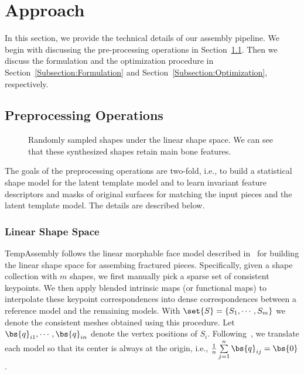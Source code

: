 \section{Approach}
\label{Section:Approach}

In this section, we provide the technical details of our assembly pipeline. We begin with discussing the pre-processing operations in Section~\ref{Subsection:Preprocessing:Operations}. Then we discuss the formulation and the optimization procedure in Section~\ref{Subsection:Formulation} and Section~\ref{Subsection:Optimization}, respectively.

\subsection{Preprocessing Operations}
\label{Subsection:Preprocessing:Operations}

\begin{figure}
\centering
\vspace{3in}
\caption{Randomly sampled shapes under the linear shape space. We can see that these synthesized shapes retain main bone features.}
\label{Figure:Shape:Space}
\end{figure}

The goals of the preprocessing operations are two-fold, i.e., to build a statistical shape model for the latent template model and to learn invariant feature descriptors and masks of original surfaces for matching the input pieces and the latent template model. The details are described below.

\subsubsection{Linear Shape Space}

TempAssembly follows the linear morphable face model described in~\cite{Blanz:1999:MMS} for building the linear shape space for assembing fractured pieces. Specifically, given a shape collection with $m$ shapes, we first manually pick a sparse set of consistent keypoints. We then apply blended intrinsic maps (or functional maps) to interpolate these keypoint correspondences into dense correspondences between a reference model and the remaining models. With $\set{S} = \{S_1,\cdots, S_m\}$ we denote the consistent meshes obtained using this procedure. Let $\bs{q}_{i1},\cdots, \bs{q}_{in}$ denote the vertex positions of $S_i$. Following~\cite{Blanz:1999:MMS}, we translate each model so that its center is always at the origin, i.e., $\frac{1}{n}\sum\limits_{j=1}^{n}\bs{q}_{ij} = \bs{0}$. 

